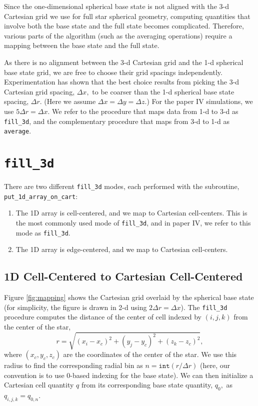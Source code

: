 Since the one-dimensional spherical base state is not aligned with the
3-d Cartesian grid we use for full star spherical geometry, computing quantities that
involve both the base state and the full state becomes complicated.
Therefore, various parts of the algorithm (such as the averaging operations)
require a mapping between the base state and the full state.

As there is no alignment between the 3-d Cartesian grid and the 1-d
spherical base state grid, we are free to choose their grid spacings
independently.  Experimentation has shown that the best choice results
from picking the 3-d Cartesian grid spacing, $\Delta x,$ to be coarser
than the 1-d spherical base state spacing, $\Delta r$.  (Here we
assume $\Delta x = \Delta y = \Delta z.$)  For the paper IV simulations,
we use $5 \Delta r = \Delta x$.  We refer to the procedure that maps data 
from 1-d to 3-d as {\tt fill\_3d}, and the
complementary procedure that maps from 3-d to 1-d as {\tt average}.
\section{\tt fill\_3d}
There are two different {\tt fill\_3d} modes, each performed with the
subroutine, {\tt put\_1d\_array\_on\_cart}:
\begin{enumerate}
\item The 1D array is cell-centered, and we map to Cartesian cell-centers.  
This is the most commonly used mode of {\tt fill\_3d}, and in paper IV, 
we refer to this mode as {\tt fill\_3d}.
\item The 1D array is edge-centered, and we map to Cartesian cell-centers.
\end{enumerate}
\subsection{1D Cell-Centered to Cartesian Cell-Centered}
\label{Sec:1D Cell-Centered to Cartesian Cell-Centered}

Figure  \ref{fig:mapping} shows the Cartesian grid overlaid by the 
spherical base state (for simplicity, the figure is drawn in 2-d 
using $2 \Delta r = \Delta x$).
The {\tt fill\_3d} procedure computes the distance of the center of
cell indexed by $(i,j,k)$ from the center of the star,
\begin{equation}
r = \sqrt{(x_i - x_c)^2 + (y_j - y_c)^2 + (z_k - z_c)^2},
\end{equation}
where $(x_c, y_c, z_c)$ are the coordinates of the center of the star.
We use this radius to find the corresponding radial bin as $n = \mathtt{int}(r
/ \Delta r)$ (here, our convention is to use 0-based indexing for the
base state).  We can then initialize a Cartesian cell quantity $q$ from its
corresponding base state quantity, $q_0,$ as $q_{i,j,k} = q_{0,n}$.

